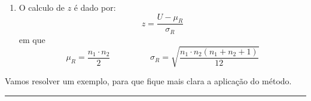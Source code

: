 \documentclass[
]{book}
\providecommand{\tightlist}{%
  \setlength{\itemsep}{0pt}\setlength{\parskip}{0pt}}
\begin{document}
\begin{enumerate}
\def\labelenumi{\arabic{enumi}.}
\setcounter{enumi}{5}
\tightlist
\item
  O calculo de \(z\) é dado por:
  \begin{equation}
  z = \frac{U - \mu_R}{\sigma_R}
  \label{eq:zMannWhitney}
  \end{equation}
  em que
  \[ 
  \mu_R = \frac{n_1 \cdot n_2}{2} \hspace{2cm} \sigma_R = \sqrt{\frac{n_1 \cdot n_2(n_1 + n_2 + 1)}{12}}
  \]
\end{enumerate}

Vamos resolver um exemplo, para que fique mais clara a aplicação do método.

\begin{center}\rule{0.5\linewidth}{0.5pt}\end{center}
\end{document}
